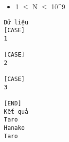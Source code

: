 \begin{itemize}
	\item     1  $\le$  N  $\le$  10^9   
\end{itemize}
\begin{verbatim}
Dữ liệu
[CASE]
1

[CASE]
2

[CASE]
3

[END]
Kết quả
Taro
Hanako
Taro
\end{verbatim}